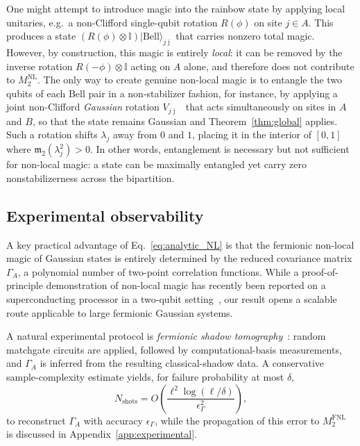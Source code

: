 \documentclass[prx,twocolumn,superscriptaddress,aps,10pt, frontmatterverbose, reprint,footinbib,longbibliography=true]{revtex4-2}
\begin{document}
One might attempt to introduce magic into the rainbow state by applying local unitaries, e.g.\ a non-Clifford single-qubit rotation $R(\phi)$ on site $j\in A$. This produces a state $(R(\phi)\otimes \mathbb{I})|\mathrm{Bell}\rangle_{j\bar\jmath}$ that carries nonzero total magic. However, by construction, this magic is entirely \emph{local}: it can be removed by the inverse rotation $R(-\phi)\otimes \mathbb{I}$ acting on $A$ alone, and therefore does not contribute to $M_2^{\mathrm{NL}}$. The only way to create genuine non-local magic is to entangle the two qubits of each Bell pair in a non-stabilizer fashion, for instance, by applying a joint non-Clifford \emph{Gaussian} rotation $V_{j\bar\jmath}$~\cite{huang2026dismagickerunitarygatenonstabilizerness} that acts simultaneously on sites in $A$ and $B$, so that the state remains Gaussian and Theorem~\ref{thm:global} applies. Such a rotation shifts $\lambda_j$ away from $0$ and $1$, placing it in the interior of $[0,1]$ where $\mathfrak{m}_2(\lambda_j^2) > 0$. In other words, entanglement is necessary but not sufficient for non-local magic: a state can be maximally entangled yet carry zero nonstabilizerness across the bipartition.


\subsection{Experimental observability}
A key practical advantage of Eq.~\eqref{eq:analytic_NL} is that the fermionic non-local magic of Gaussian states is entirely determined by the reduced covariance matrix $\Gamma_A$, a polynomial number of two-point correlation functions.
While a proof-of-principle demonstration of non-local magic has recently been reported on a superconducting processor in a two-qubit setting~\cite{ahmad2025experimentaldemonstrationnonlocalmagic}, our result opens a scalable route applicable to large fermionic Gaussian systems.

A natural experimental protocol is \emph{fermionic shadow tomography}~\cite{Wan_2023}: random matchgate circuits are applied, followed by computational-basis measurements, and $\Gamma_A$ is inferred from the resulting classical-shadow data.
A conservative sample-complexity estimate yields, for failure probability at most $\delta$,
\[
N_{\mathrm{shots}} = O\!\left(\frac{\ell^2 \log(\ell/\delta)}{\epsilon_\Gamma^2}\right),
\]
to reconstruct \(\Gamma_A\) with accuracy \(\epsilon_\Gamma\), while the propagation of this error  to \(M_2^{\mathrm{FNL}}\) is discussed in  Appendix~\ref{app:experimental}.
\end{document}
